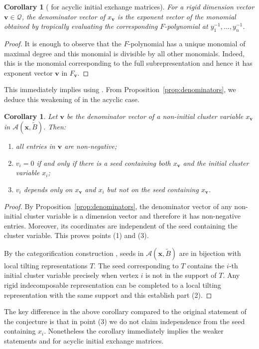 \documentclass[pdftex]{sigma}
\newcommand{\bfv}{\mathbf{v}}
\newcommand{\bfx}{\mathbf{x}}
\newcommand{\cA}{\mathcal{A}}
\newcommand{\cQ}{\mathcal{Q}}
\newtheorem{Corollary}[Theorem]{Corollary}
\begin{document}
  \begin{Corollary}[{\cite[Conjecture 7.17]{fomin-zelevinsky4} for acyclic initial exchange matrices}]
    For a rigid dimension vector $\bfv\in\cQ$, the denominator vector of $x_\bfv$ is the exponent vector of the monomial obtained by tropically evaluating the corresponding $F$-polynomial at $y_1^{-1},\dots,y_n^{-1}$.
  \end{Corollary}
  \begin{proof}
    It is enough to observe that the $F$-polynomial has a unique monomial of maximal degree and this monomial is divisible by all other monomials.
    Indeed, this is the monomial corresponding to the full subrepresentation and hence it has exponent vector $\bfv$ in $F_\bfv$.
  \end{proof}
  This immediately implies \cite[Conjecture 6.11]{fomin-zelevinsky4} using \cite[Proposition 7.16]{fomin-zelevinsky4}.  
  From Proposition~\ref{prop:denominators}, we deduce this weakening of \cite[Conjecture 7.4]{fomin-zelevinsky4} in the acyclic case.
  \begin{Corollary}
    \label{cor:sign_coherence}
    Let $\bfv$ be the denominator vector of a non-initial cluster variable $x_\bfv$ in $\cA(\bfx,\widetilde{B})$.
    Then:
    \begin{enumerate}
      \item
        all entries in $\bfv$ are non-negative;
        
      \item
        $v_i=0$ if and only if there is a seed containing both $x_\bfv$ and the initial cluster variable $x_i$;

      \item
        $v_i$ depends only on $x_\bfv$ and $x_i$ but not on the seed containing $x_\bfv$.
    \end{enumerate}
  \end{Corollary}
  \begin{proof}
    By Proposition~\ref{prop:denominators}, the denominator vector of any non-initial cluster variable is a dimension vector and therefore it has non-negative entries.
    Moreover, its coordinates are independent of the seed containing the cluster variable. 
    This proves points (1) and (3).

    By the categorification construction \cite{rupel2}, seeds in $\cA(\bfx,\widetilde{B})$ are in bijection with local tilting representations $T$.
    The seed corresponding to $T$ contains the $i$-th initial cluster variable precisely when vertex $i$ is not in the support of $T$.
    Any rigid indecomposable representation can be completed to a local tilting representation with the same support and this establish part (2).
  \end{proof}
  The key difference in the above corollary compared to the original statement of the conjecture is that in point (3) we do not claim independence from the seed containing $x_i$.
  Nonetheless the corollary immediately implies the weaker statements \cite[Conjecture 7.5]{fomin-zelevinsky4} and \cite[Conjecture~2.9]{reading-stella} for acyclic initial exchange matrices.
 
\end{document}

